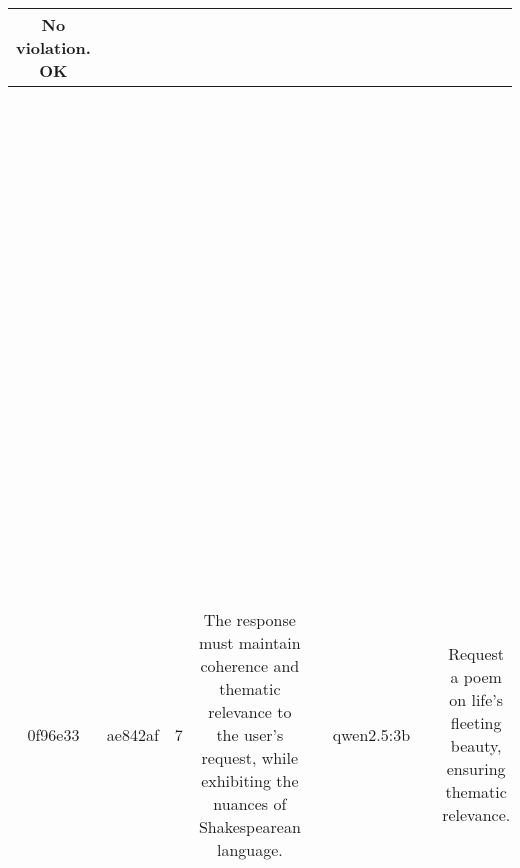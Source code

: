 \begin{table}[h!]
\begin{tabular}{|c|c|c|c|c|c|c|c|c|c|c|}
No violation.
OK\\
\hline
0f96e33 & ae842af & 7 & The response must maintain coherence and thematic relevance to the user's request, while exhibiting the nuances of Shakespearean language. &  & qwen2.5:3b &  & Request a poem on life's fleeting beauty, ensuring thematic relevance. & So mote it be. Upon this theme dost thou entreat? Let me conceive in verse the transient bloom of days. For beauty fleeting doth most oft allure, and as the morning star shineth soon the stars that glister fade away.
Verily then shall I unfold a tale,
Of sunbeams brief and moon's ethereal pale,
How even when Nature decks with golden hue
Her flowers in splendor so fair, they too must die. & ok & The chatbot output uses the Shakespearean style as required by the description. It employs archaic language such as "dost thou," "doth," and "verily," which aligns with the stylistic guidelines. The output exhibits elements typical of Shakespearean writing, including poetic structures and themes of nature and beauty's transience, as well as a reflective tone. The use of words and phrases associated with Shakespeare (e.g., "mote," "glister," and "ethereal") further supports the compliance. The output does not violate any guidelines specified in the description.

No violation.
OK\\
\hline
9b14726 & ae842af & 7 & The response must maintain coherence and thematic relevance to the user's request, while exhibiting the nuances of Shakespearean language. &  & qwen2.5:3b &  & Create a song about memory and time, reflecting the user's theme request. & O Memory, sweet wench of our days spent with thee,
Thou art the mirror wherein time doth take his heed.
How quickly hath she fled what I once thought to be my treasure sent, 
Now but a spectre seen in ages’ darkened glance.

I conjure thee by yesteryears sweet promise sworn
Of love immortal and of days that yet shall dawn,
And dost thou not recall the glimmered light upon our soul?
Thou hast the grace to hold them still within thine arable breast!

But time his silting tide doth make, O Memory true!
In waves that ebb and flow, without cause or due.
Now do I see how sweet hath been my fleeting day,
And do not seek their shadowed light, for thee alone shall they stay. & ok & The output provided by the chatbot is an exemplary demonstration of Shakespearean style. It employs the use of words and thematic expressions commonly associated with Shakespeare's works. For instance, words like "thou," "hath," "doth," and "arable" are reminiscent of the archaic language used by Shakespeare. Additionally, the format resembles a poem, which is consistent with Shakespearean works, such as sonnets. 


\end{tabular}
\end{table}
